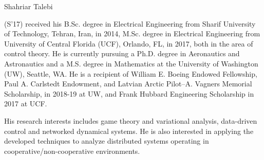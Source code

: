 \documentclass[journal]{IEEEtran}
\theoremstyle{definition}
\theoremstyle{remark}
\begin{document}


% 
\begin{IEEEbiography}{Shahriar Talebi}
    
    (S'17) received his B.Sc. degree in Electrical Engineering from Sharif University of Technology, Tehran, Iran, in 2014, M.Sc. degree in Electrical Engineering from University of Central Florida (UCF), Orlando, FL, in 2017, both in the area of control theory.
    He is currently pursuing a Ph.D. degree in Aeronautics and Astronautics and a M.S. degree in Mathematics at the University of Washington (UW), Seattle, WA. 
    He is a recipient of William E. Boeing Endowed Fellowship, Paul A. Carlstedt Endowment, and Latvian Arctic Pilot--A. Vagners Memorial Scholarship, in 2018-19 at UW, and Frank Hubbard Engineering Scholarship in 2017 at UCF.
    
    His research interests includes game theory and variational analysis, data-driven control and networked dynamical systems. 
    He is also interested in applying the developed techniques to analyze distributed systems operating in cooperative/non-cooperative environments.
\end{IEEEbiography}
\end{document}
